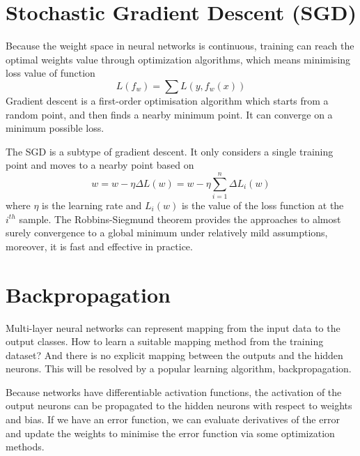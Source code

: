 \section{Stochastic Gradient Descent (SGD)}

Because the weight space in neural networks is continuous, training can reach the optimal weights value through optimization algorithms, which means minimising loss value of function
\begin{equation}\label{eq:LossMin}
L(f_{w}) = \sum L(y, f_{w}(x))
\end{equation}
Gradient descent is a first-order optimisation algorithm which starts from a random point, and then finds a nearby minimum point. It can converge on a minimum possible loss.

The SGD is a subtype of gradient descent. It only considers a single training point and moves to a nearby point based on
\begin{equation}\label{eq:SGDUpdate}
w = w - \eta  \Delta L(w) = w - \eta \sum_{i=1}^{n} \Delta L_{i}(w)
\end{equation}
where $\eta$ is the learning rate and $L_{i}(w)$ is the value of the loss function at the $i^{th}$ sample. The Robbins-Siegmund theorem \citep{robbins1985convergence} provides the approaches to almost surely convergence to a global minimum under relatively mild assumptions, moreover, it is fast and effective in practice.

\section{Backpropagation}

Multi-layer neural networks can represent mapping from the input data to the output classes. How to learn a suitable mapping method from the training dataset? And there is no explicit mapping between the outputs and the hidden neurons. This will be resolved by a popular learning algorithm, backpropagation.

Because networks have differentiable activation functions, the activation of the output neurons can be propagated to the hidden neurons with respect to weights and bias. If we have an error function, we can evaluate derivatives of the error and update the weights to minimise the error function via some optimization methods.

